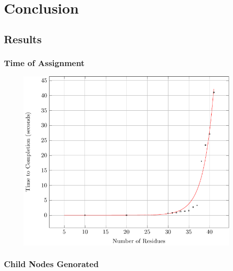 \documentclass{beamer}
\begin{document}
\section{Conclusion}

\subsection{Results}

\begin{frame}
	\frametitle{Time of Assignment}
	\begin{figure}[H]
	\begin{center}
	\includegraphics[width=.65\textwidth]{plot}
	\end{center}
	\end{figure}
\end{frame}

\begin{frame}
	\frametitle{Child Nodes Genorated}
	\begin{figure}[H]
	\begin{center}
	\resizebox{!}{.6\paperheight}{}
	\end{center}
	\end{figure}
\end{frame}

\end{document}
